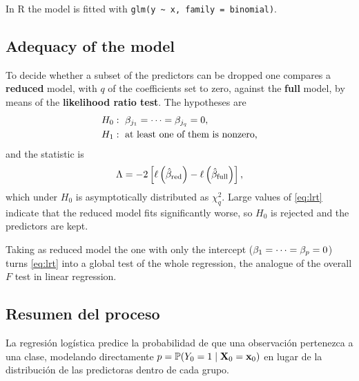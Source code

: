 \begin{remark}
  In \textsf{R} the model is fitted with
  \texttt{glm(y \textasciitilde\ x, family = binomial)}.
\end{remark}

\subsection{Adequacy of the model}
\label{subsec:logistic_adequacy}

To decide whether a subset of the predictors can be dropped one compares a
\textbf{reduced} model, with $q$ of the coefficients set to zero, against the
\textbf{full} model, by means of the \textbf{likelihood ratio test}. The
hypotheses are
\begin{equation}
  \label{eq:lrt_hypotheses}
  \begin{aligned}
    H_0&:\ \beta_{j_1}=\dots=\beta_{j_q}=0,\\
    H_1&:\ \text{at least one of them is nonzero,}
  \end{aligned}
\end{equation}
and the statistic is
\begin{equation}
  \label{eq:lrt}
  \Lambda=-2\left[ \ell\left( \hat{\beta}_{\text{red}} \right)
              -\ell\left( \hat{\beta}_{\text{full}} \right) \right],
\end{equation}
which under $H_0$ is asymptotically distributed as $\chi^2_q$. Large values of
\eqref{eq:lrt} indicate that the reduced model fits significantly worse, so
$H_0$ is rejected and the predictors are kept.

\begin{remark}
  Taking as reduced model the one with only the intercept
  ($\beta_1=\dots=\beta_p=0$) turns \eqref{eq:lrt} into a global test of the whole
  regression, the analogue of the overall $F$ test in linear regression.
\end{remark}

\subsection{Resumen del proceso}
\label{subsec:resumen_logistica}

La regresi\'on log\'istica predice la probabilidad de que una observaci\'on
pertenezca a una clase, modelando directamente
$p=\mathbb{P}(Y_0=1\mid\mathbf{X}_0=\mathbf{x}_0)$ en lugar de la distribuci\'on de las
predictoras dentro de cada grupo.

